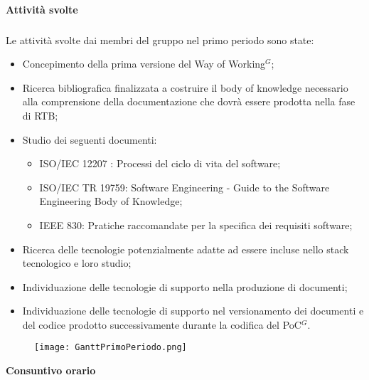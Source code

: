 \paragraph{Attività svolte} 
\subparagraph{}
Le attività svolte dai membri del gruppo nel primo periodo sono state:
\begin{itemize}
    \item Concepimento della prima versione del Way of Working$^{G}$;
    \item Ricerca bibliografica finalizzata a costruire il body of knowledge necessario alla comprensione della documentazione
    che dovrà essere prodotta nella fase di RTB;
    \item Studio dei seguenti documenti:
    \begin{itemize}
        \item ISO/IEC 12207 : Processi del ciclo di vita del software;
        \item ISO/IEC TR 19759: Software Engineering - Guide to the Software Engineering Body of Knowledge; 
        \item IEEE 830: Pratiche raccomandate per la specifica dei requisiti software;
    \end{itemize}
    \item Ricerca delle tecnologie potenzialmente adatte ad essere incluse nello
    stack tecnologico e loro studio;
    \item Individuazione delle tecnologie di supporto nella produzione di documenti; 
    \item Individuazione delle tecnologie di supporto nel versionamento dei documenti e del codice prodotto
    successivamente durante la codifica del PoC$^{G}$.
\end{itemize}

\graphicspath{ {./src/Gantt/} } 

\begin{figure}[h] \texttt{[image: GanttPrimoPeriodo.png]} \end{figure}

\textbf{Consuntivo orario}

